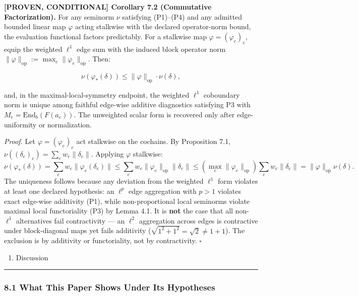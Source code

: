 \documentclass[
  11pt,
]{article}
\providecommand{\tightlist}{%
  \setlength{\itemsep}{0pt}\setlength{\parskip}{0pt}}
\providecommand{\tightlist}{%
  \setlength{\itemsep}{0pt}\setlength{\parskip}{0pt}}
\renewenvironment{quote}
  {\begin{leftbar}\small}
  {\end{leftbar}}
\begin{document}
\begin{quote}
\textbf{{[}PROVEN, CONDITIONAL{]} Corollary 7.2 (Commutative Factorization).} For any seminorm \(\nu\) satisfying (P1)--(P4) and any admitted bounded linear map \(\varphi\) acting stalkwise with the declared operator-norm bound, the evaluation functional factors predictably. For a stalkwise map \(\varphi=(\varphi_e)_e\), equip the weighted \(\ell^1\) edge sum with the induced block operator norm \(\|\varphi\|_{\text{op}} := \max_e \|\varphi_e\|_{\text{op}}\). Then:

\[\nu(\varphi_*(\delta)) \leq \|\varphi\|_{\text{op}} \cdot \nu(\delta),\]

and, in the maximal-local-symmetry endpoint, the weighted \(\ell^1\) coboundary norm is unique among faithful edge-wise additive diagnostics satisfying P3 with \(M_e = \mathrm{End}_b(F(a_e))\). The unweighted scalar form is recovered only after edge-uniformity or normalization.

\emph{Proof.} Let \(\varphi = (\varphi_e)_e\) act stalkwise on the cochains. By Proposition 7.1, \(\nu((\delta_e)_e) = \sum_e w_e \|\delta_e\|\). Applying \(\varphi\) stalkwise:
\[\nu(\varphi_*(\delta)) = \sum_e w_e \|\varphi_e(\delta_e)\| \leq \sum_e w_e \|\varphi_e\|_{\text{op}} \|\delta_e\| \leq \left(\max_e \|\varphi_e\|_{\text{op}}\right) \sum_e w_e \|\delta_e\| = \|\varphi\|_{\text{op}} \nu(\delta).\]
The uniqueness follows because any deviation from the weighted \(\ell^1\) form violates at least one declared hypothesis: an \(\ell^p\) edge aggregation with \(p>1\) violates exact edge-wise additivity (P1), while non-proportional local seminorms violate maximal local functoriality (P3) by Lemma 4.1. It is \textbf{not} the case that all non-\(\ell^1\) alternatives fail contractivity --- an \(\ell^2\) aggregation across edges is contractive under block-diagonal maps yet fails additivity (\(\sqrt{1^2+1^2}=\sqrt2\neq 1+1\)). The exclusion is by additivity or functoriality, not by contractivity. \(\square\)

\begin{enumerate}
\def\labelenumi{\arabic{enumi}.}
\setcounter{enumi}{7}
\tightlist
\item
  Discussion
\end{enumerate}
\end{quote}

\begin{center}\rule{0.5\linewidth}{0.5pt}\end{center}

\subsubsection{8.1 What This Paper Shows Under Its Hypotheses}\label{what-this-paper-shows-under-its-hypotheses}
\end{document}
